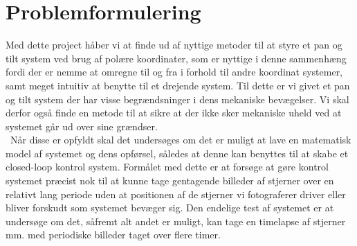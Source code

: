 \section{Problemformulering}

Med dette project håber vi at finde ud af nyttige metoder til at styre et pan og tilt system ved brug af polære koordinater, som er nyttige i denne sammenhæng fordi der er nemme at omregne til og fra i forhold til andre koordinat systemer, samt meget intuitiv at benytte til et drejende system. Til dette er vi givet et pan og tilt system der har visse begrændsninger i dens mekaniske bevægelser. Vi skal derfor også finde en metode til at sikre at der ikke sker mekaniske uheld ved at systemet går ud over sine grændser.
\\\
Når disse er opfyldt skal det undersøges om det er muligt at lave en matematisk model af systemet og dens opførsel, således at denne kan benyttes til at skabe et closed-loop kontrol system. Formålet med dette er at forsøge at gøre kontrol systemet præcist nok til at kunne tage gentagende billeder af stjerner over en relativt lang periode uden at positionen af de stjerner vi fotograferer driver eller bliver forskudt som systemet bevæger sig. Den endelige test af systemet er at undersøge om det, såfremt alt andet er muligt, kan tage en timelapse af stjerner mm. med periodiske billeder taget over flere timer.

